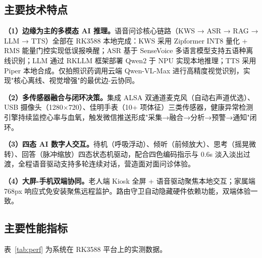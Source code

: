 \documentclass[12pt, a4paper]{ctexart}
\begin{document}
\subsection{主要技术特点}

\textbf{（1）边缘为主的多模态 AI 推理。}语音问诊核心链路（KWS → ASR → RAG → LLM → TTS）全部在 RK3588 本地完成：KWS 采用 Zipformer INT8 量化 + RMS 能量门控实现低误报唤醒；ASR 基于 SenseVoice 多语言模型支持五语种离线识别；LLM 通过 RKLLM 框架部署 Qwen2 于 NPU 实现本地推理；TTS 采用 Piper 本地合成。仅拍照识药调用云端 Qwen-VL-Max 进行高精度视觉识别，实现"核心离线、视觉增强"的最优边-云协同。

\textbf{（2）多传感器融合与闭环决策。}集成 ALSA 双通道麦克风（自动右声道优选）、USB 摄像头（1280$\times$720）、佳明手表（10+ 项体征）三类传感器，健康异常检测引擎持续监控心率与血氧，触发微信推送形成"采集→融合→分析→预警→通知"闭环。

\textbf{（3）四态 AI 数字人交互。}待机（呼吸浮动）、倾听（前倾放大）、思考（摇晃微转）、回答（脉冲缩放）四态状态机驱动，配合四色编码指示与 0.6s 淡入淡出过渡，全程语音驱动支持多轮连续对话，营造面对面问诊体验。

\textbf{（4）大屏-手机双端协同。}老人端 Kiosk 全屏 + 语音驱动聚焦本地交互；家属端 768px 响应式免安装聚焦远程监护。路由守卫自动隐藏硬件依赖功能，双端体验一致。


\subsection{主要性能指标}

表~\ref{tab:perf} 为系统在 RK3588 平台上的实测数据。
\end{document}
